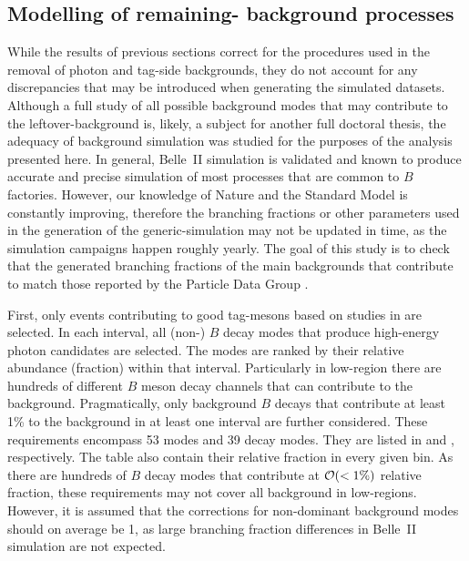 \subsection{Modelling of remaining-\texorpdfstring{\BB}{BB} background processes}\label{sec:remaining_bb_background_modelling}

While the results of previous sections correct for the procedures used in the removal of photon and tag-side backgrounds, they do not account for any discrepancies that may be introduced when generating the simulated datasets.
Although a full study of all possible background modes that may contribute to the leftover-\BB background is, likely, a subject for another full doctoral thesis, the adequacy of background simulation was studied for the purposes of the analysis presented here.
In general, Belle~II simulation is validated and known to produce accurate and precise simulation of most processes that are common to $B$ factories.
However, our knowledge of Nature and the Standard Model is constantly improving, therefore the branching fractions or other parameters used in the generation of the generic-\BB simulation may not be updated in time, as the simulation campaigns happen roughly yearly.
The goal of this study is to check that the generated branching fractions of the main backgrounds that contribute to \BtoXsgamma match those reported by the Particle Data Group \cite{Workman:2022ynf}.

First, only events contributing to good tag-\B mesons based on studies in  are selected.
In each \EB interval, all (non-\BtoXsgamma) $B$ decay modes that produce high-energy photon candidates are selected.
The modes are ranked by their relative abundance (fraction) within that \EB interval.
Particularly in low-\EB region there are hundreds of different $B$ meson decay channels that can contribute to the background.
Pragmatically, only background $B$ decays that contribute at least 1\% to the background in at least one \EB interval are further considered.
These requirements encompass 53 \Bp modes and 39 \Bz decay modes. 
They are listed in  and , respectively.
The table also contain their relative fraction in every given bin.
As there are hundreds of $B$ decay modes that contribute at ${\cal O}(<1\%)$ relative fraction, these requirements may not cover all background in low-\EB regions. 
However, it is assumed that the corrections for non-dominant background modes should on average be 1, as large branching fraction differences in Belle~II simulation are not expected.

